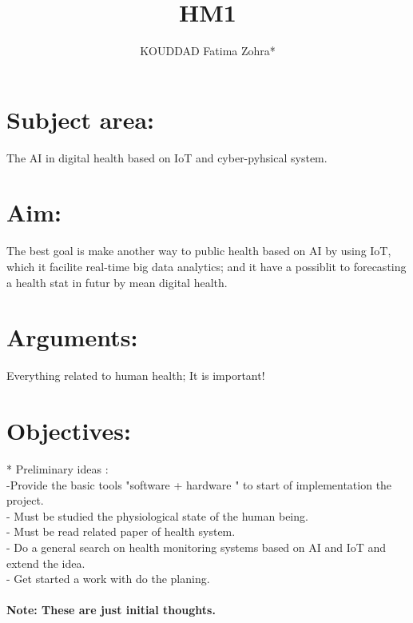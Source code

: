 \documentclass[11pt]{article}
\begin{document}
\title{HM1} 
\author{KOUDDAD Fatima Zohra* } 
\maketitle

\section{Subject area:}
The AI in digital health based on IoT and cyber-pyhsical system. \\
\section{Aim:}
The best goal is make another way to public health based on AI by using IoT, which it facilite real-time big data analytics; and it have a possiblit to forecasting a health stat in futur by  mean digital health. \\
\section{Arguments:} 
Everything related to human health; It is important! \\
\section{Objectives:} 
* Preliminary ideas : \\
    -Provide the basic tools "software + hardware " to start of  implementation the project. \\
    - Must be studied the physiological state of the human being. \\
    - Must be read related paper of health system. \\
    - Do a general search on health monitoring systems based on AI and IoT and extend the idea.  \\
    - Get started a work with do the  planing. \\
    \\
\bf Note: These are just initial thoughts.
\end{document}
